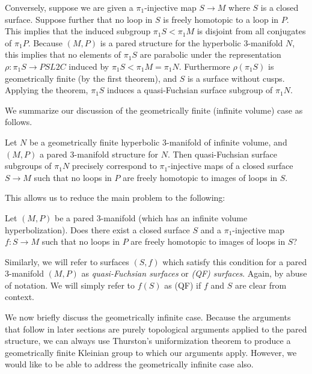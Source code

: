 Conversely, suppose we are given a $\pi_1$-injective map $S \to M$ where $S$ is
a closed surface.  Suppose further that no loop in $S$ is freely homotopic to
a loop in $P$.  This implies that the induced subgroup $\pi_1S < \pi_1M$ is
disjoint from all conjugates of $\pi_1P$.  Because $(M,P)$ is a pared structure
for the hyperbolic 3-manifold $N$, this implies that no elements of $\pi_1S$
are parabolic under the representation $\rho \colon \pi_1S \to PSL2C$ induced
by $\pi_1S < \pi_1M=\pi_1N$.  Furthermore $\rho(\pi_1S)$ is geometrically
finite (by the first theorem), and $S$ is a surface without cusps.  Applying
the theorem, $\pi_1S$ induces a quasi-Fuchsian surface subgroup of $\pi_1N$.

We summarize our discussion of the geometrically finite (infinite volume) case
as follows.

\begin{prop}

Let $N$ be a geometrically finite hyperbolic 3-manifold of infinite volume, and
$(M,P)$ a pared 3-manifold structure for $N$. Then quasi-Fuchsian surface
subgroups of $\pi_1N$ precisely correspond to $\pi_1$-injective maps of
a closed surface $S \to M$ such that no loops in $P$ are freely homotopic to
images of loops in $S$.

\end{prop}

This allows us to reduce the main problem to the following:

\begin{prob}

Let $(M,P)$ be a pared 3-manifold (which has an infinite volume
hyperbolization).  Does there exist a closed surface $S$ and
a $\pi_1$-injective map $f \colon S \to M$ such that no loops in $P$ are freely
homotopic to images of loops in $S$?

\end{prob}

Similarly, we will refer to surfaces $(S,f)$ which satisfy this condition for
a pared 3-manifold $(M,P)$ as \emph{quasi-Fuchsian surfaces} or \emph{(QF)
surfaces}.  Again, by abuse of notation. We will simply refer to $f(S)$ as (QF)
if $f$ and $S$ are clear from context.

We now briefly discuss the geometrically infinite case. Because the arguments
that follow in later sections are purely topological arguments applied to the
pared structure, we can always use Thurston's uniformization theorem to produce
a geometrically finite Kleinian group to which our arguments apply. However, we
would like to be able to address the geometrically infinite case also.

